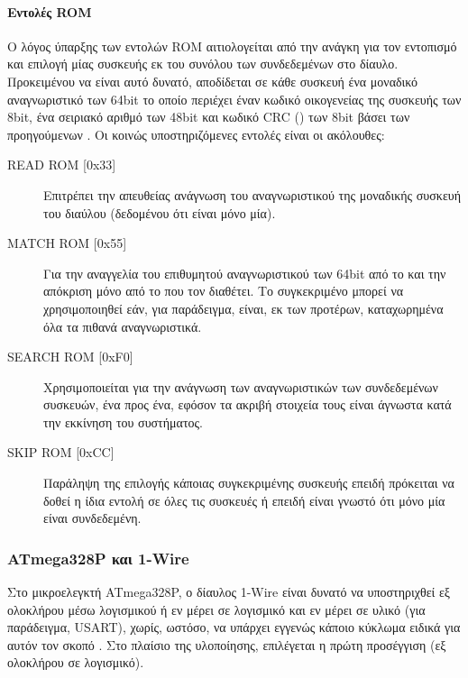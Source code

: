 \paragraph{Εντολές ROM}%
Ο λόγος ύπαρξης των εντολών ROM αιτιολογείται από την ανάγκη για τον εντοπισμό
και επιλογή μίας συσκευής  εκ του συνόλου των συνδεδεμένων στο δίαυλο.
Προκειμένου να είναι αυτό δυνατό, αποδίδεται σε κάθε συσκευή ένα μοναδικό
αναγνωριστικό των 64bit το οποίο περιέχει έναν κωδικό οικογενείας της συσκευής
των 8bit, ένα σειριακό αριθμό των 48bit και κωδικό CRC () των 8bit βάσει των προηγούμενων  \parencite[6]{ds18b20}.
Οι κοινώς υποστηριζόμενες εντολές  είναι οι ακόλουθες:
\begin{description}
    \item[READ ROM [0x33{]}] Επιτρέπει την απευθείας ανάγνωση του
    αναγνωριστικού της μοναδικής  συσκευή του διαύλου (δεδομένου ότι
    είναι μόνο μία).

    \item[MATCH ROM [0x55{]}] Για την αναγγελία του επιθυμητού αναγνωριστικού
    των 64bit από το  και την απόκριση μόνο από το  που τον
    διαθέτει. Το συγκεκριμένο μπορεί να χρησιμοποιηθεί εάν, για παράδειγμα,
    είναι, εκ των προτέρων, καταχωρημένα όλα τα πιθανά αναγνωριστικά.

    \item[SEARCH ROM [0xF0{]}] Χρησιμοποιείται για την ανάγνωση των
    αναγνωριστικών των συνδεδεμένων συσκευών, ένα προς ένα, εφόσον τα ακριβή
    στοιχεία τους είναι άγνωστα κατά την εκκίνηση του συστήματος.

    \item[SKIP ROM [0xCC{]}] Παράληψη της επιλογής κάποιας συγκεκριμένης
    συσκευής επειδή πρόκειται να δοθεί η ίδια εντολή σε όλες τις συσκευές ή
    επειδή είναι γνωστό ότι μόνο μία είναι συνδεδεμένη.
\end{description}


\subsubsection{ATmega328P και 1-Wire}

Στο μικροελεγκτή ATmega328P, ο δίαυλος 1-Wire είναι δυνατό να υποστηριχθεί εξ
ολοκλήρου μέσω λογισμικού ή εν μέρει σε λογισμικό και εν μέρει σε υλικό (για
παράδειγμα, USART), χωρίς, ωστόσο, να υπάρχει εγγενώς κάποιο κύκλωμα ειδικά για
αυτόν τον σκοπό \parencite[3]{atmel04}. Στο πλαίσιο της υλοποίησης, επιλέγεται η
πρώτη προσέγγιση (εξ ολοκλήρου σε λογισμικό).

